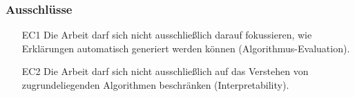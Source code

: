 \subsubsection{Ausschlüsse}

\begin{enumerate}
    \item[EC1] Die Arbeit darf sich nicht ausschließlich darauf fokussieren, wie Erklärungen automatisch generiert werden können (Algorithmus-Evaluation).
    \item[EC2] Die Arbeit darf sich nicht ausschließlich auf das Verstehen von zugrundeliegenden Algorithmen beschränken (Interpretability).
\end{enumerate}
